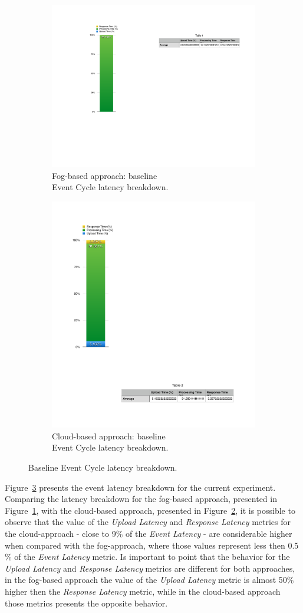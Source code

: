 \begin{figure}[ht!]
  \centering
  \begin{subfigure}{.5\textwidth}
    \centering
    \includegraphics[width=.365\linewidth]{./images/ecspec_local_breakdown}
    \caption{Fog-based approach: baseline\\Event Cycle latency breakdown.}
    \label{fig:ecspec_local}
  \end{subfigure}%
  \begin{subfigure}{.5\textwidth}
    \centering
    \includegraphics[width=.4\linewidth]{./images/ecspec_cloud_breakdown}
    \caption{Cloud-based approach: baseline\\Event Cycle latency breakdown.}
    \label{fig:ecspec_cloud}
  \end{subfigure}
  \caption{Baseline Event Cycle latency breakdown.}
  \label{fig:ecspec_breakdown}
\end{figure}

Figure~\ref{fig:ecspec_breakdown} presents the event latency breakdown for the current experiment.
Comparing the latency breakdown for the fog-based approach, presented in Figure~\ref{fig:ecspec_local},
with the cloud-based approach, presented in Figure~\ref{fig:ecspec_cloud}, it is possible to observe
that the value of the \textit{Upload Latency} and \textit{Response Latency} metrics for the cloud-approach
- close to 9$\%$ of the \textit{Event Latency} - are considerable higher when compared with the fog-approach,
where those values represent less then 0.5$\%$ of the \textit{Event Latency} metric. Is important to
point that the behavior for the \textit{Upload Latency} and \textit{Response Latency} metrics are
different for both approaches, in the fog-based approach the value of the \textit{Upload Latency}
metric is almost 50$\%$ higher then the \textit{Response Latency} metric, while in the cloud-based
approach those metrics presents the opposite behavior.\\

